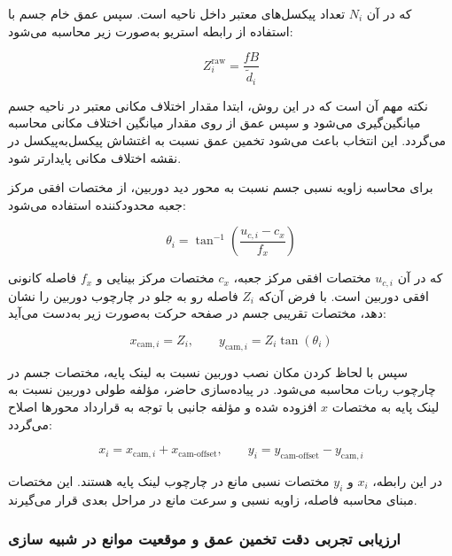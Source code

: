 که در آن \(N_i\) تعداد پیکسل‌های معتبر داخل ناحیه است. سپس عمق خام جسم با استفاده از رابطه استریو به‌صورت زیر محاسبه می‌شود:

\begin{equation}
	Z_i^{\mathrm{raw}} =
	\frac{fB}{\tilde{d}_i}
	\label{eq:obstacle_raw_depth}
\end{equation}

نکته مهم آن است که در این روش، ابتدا مقدار اختلاف مکانی معتبر در ناحیه جسم میانگین‌گیری می‌شود و سپس عمق از روی مقدار میانگین اختلاف مکانی محاسبه می‌گردد. این انتخاب باعث می‌شود تخمین عمق نسبت به اغتشاش پیکسل‌به‌پیکسل در نقشه اختلاف مکانی پایدارتر شود.

برای محاسبه زاویه نسبی جسم نسبت به محور دید دوربین، از مختصات افقی مرکز جعبه محدودکننده استفاده می‌شود:

\begin{equation}
	\theta_i =
	\tan^{-1}
	\left(
	\frac{u_{c,i}-c_x}{f_x}
	\right)
	\label{eq:obstacle_bearing}
\end{equation}

که در آن \(u_{c,i}\) مختصات افقی مرکز جعبه، \(c_x\) مختصات مرکز بینایی و \(f_x\) فاصله کانونی افقی دوربین است. با فرض آن‌که \(Z_i\) فاصله رو به جلو در چارچوب دوربین را نشان دهد، مختصات تقریبی جسم در صفحه حرکت به‌صورت زیر به‌دست می‌آید:

\begin{equation}
	x_{\text{cam},i} = Z_i,
	\qquad
	y_{\text{cam},i} = Z_i \tan(\theta_i)
	\label{eq:camera_xy_from_depth}
\end{equation}

سپس با لحاظ کردن مکان نصب دوربین نسبت به لینک پایه، مختصات جسم در چارچوب ربات محاسبه می‌شود. در پیاده‌سازی حاضر، مؤلفه طولی دوربین نسبت به لینک پایه به مختصات \(x\) افزوده شده و مؤلفه جانبی با توجه به قرارداد محورها اصلاح می‌گردد:

\begin{equation}
	x_i = x_{\text{cam},i} + x_{\text{cam-offset}},
	\qquad
	y_i = y_{\text{cam-offset}} - y_{\text{cam},i}
	\label{eq:base_link_obstacle_xy}
\end{equation}

در این رابطه، \(x_i\) و \(y_i\) مختصات نسبی مانع در چارچوب لینک پایه هستند. این مختصات مبنای محاسبه فاصله، زاویه نسبی و سرعت مانع در مراحل بعدی قرار می‌گیرند.

\subsubsection{ارزیابی تجربی دقت تخمین عمق و موقعیت موانع در شبیه سازی}

